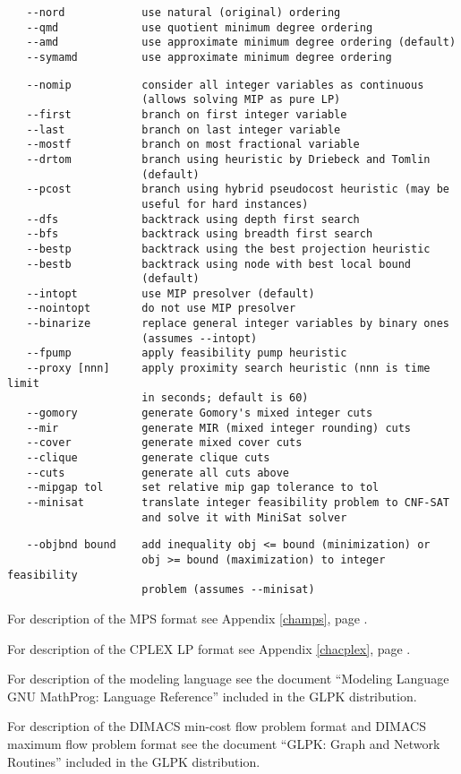 
\begin{verbatim}
   --nord            use natural (original) ordering
   --qmd             use quotient minimum degree ordering
   --amd             use approximate minimum degree ordering (default)
   --symamd          use approximate minimum degree ordering
\end{verbatim}


\begin{verbatim}
   --nomip           consider all integer variables as continuous
                     (allows solving MIP as pure LP)
   --first           branch on first integer variable
   --last            branch on last integer variable
   --mostf           branch on most fractional variable
   --drtom           branch using heuristic by Driebeck and Tomlin
                     (default)
   --pcost           branch using hybrid pseudocost heuristic (may be
                     useful for hard instances)
   --dfs             backtrack using depth first search
   --bfs             backtrack using breadth first search
   --bestp           backtrack using the best projection heuristic
   --bestb           backtrack using node with best local bound
                     (default)
   --intopt          use MIP presolver (default)
   --nointopt        do not use MIP presolver
   --binarize        replace general integer variables by binary ones
                     (assumes --intopt)
   --fpump           apply feasibility pump heuristic
   --proxy [nnn]     apply proximity search heuristic (nnn is time limit
                     in seconds; default is 60)
   --gomory          generate Gomory's mixed integer cuts
   --mir             generate MIR (mixed integer rounding) cuts
   --cover           generate mixed cover cuts
   --clique          generate clique cuts
   --cuts            generate all cuts above
   --mipgap tol      set relative mip gap tolerance to tol
   --minisat         translate integer feasibility problem to CNF-SAT
                     and solve it with MiniSat solver
\end{verbatim}

\newpage

\begin{verbatim}
   --objbnd bound    add inequality obj <= bound (minimization) or
                     obj >= bound (maximization) to integer feasibility
                     problem (assumes --minisat)
\end{verbatim}

For description of the MPS format see Appendix \ref{champs}, page
\pageref{champs}.

For description of the CPLEX LP format see Appendix \ref{chacplex},
page \pageref{chacplex}.

For description of the modeling language see the document ``Modeling
Language GNU MathProg: Language Reference'' included in the GLPK
distribution.

For description of the DIMACS min-cost flow problem format and DIMACS
maximum flow problem format see the document ``GLPK: Graph and Network
Routines'' included in the GLPK distribution.

